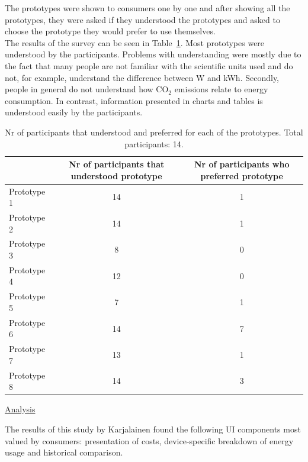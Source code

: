 \documentclass[journal]{vgtc}                %
\begin{document}
The prototypes were shown to consumers one by one and after showing all the prototypes, they were asked if they understood the prototypes and asked to choose the prototype they would prefer to use themselves.\\

The results of the survey can be seen in Table~\ref{prototypesresults}. Most prototypes were understood by the participants. Problems with understanding were mostly due to the fact that many people are not familiar with the scientific units used and do not, for example, understand the difference between W and kWh. Secondly, people in general do not understand how CO$_2$ emissions relate to energy consumption.
In contrast, information presented in charts and tables is understood easily by the participants.

\begin{table}
  \caption{Nr of participants that understood and preferred for each of the prototypes. Total participants: 14.}
  \label{prototypesresults}
  \scriptsize
  \begin{center}
    \begin{tabular}{|lcc|}
    \hline
       & \multicolumn{1}{p{2.5cm}}{\centering Nr of participants that understood prototype} & 
       \multicolumn{1}{p{3cm}|}{\centering Nr of participants who preferred prototype}  \\ \hline
       Prototype 1 & 14 & 1 \\ 
       Prototype 2 & 14 & 1 \\ 
       Prototype 3 & 8 & 0 \\ 
       Prototype 4 & 12 & 0 \\ 
       Prototype 5 & 7 & 1 \\ 
       Prototype 6 & 14 & 7 \\ 
       Prototype 7 & 13 & 1 \\ 
       Prototype 8 & 14 & 3 \\ \hline
    \end{tabular}
  \end{center}
\end{table}

\underline{Analysis}

The results of this study by Karjalainen found the following UI components most valued by consumers: presentation of costs, device-specific breakdown of energy usage and historical comparison.  %

~\\
\end{document}
